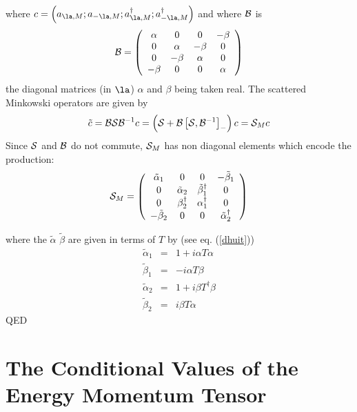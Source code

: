 \documentclass[12pt]{article}
\begin{document}
where $c=  \left( a_{\la,M};a_{- \la,M};a_{\la,M}^\dagger;a_{- \la,M}^\dagger
\right)$
 and where $ {\cal  B}$ is
\begin{equation}
  {\cal  B} =
\left( \begin{array}{cccc}
 \alpha &  0 & 0 & - \beta \\
 0 & \alpha & - \beta  & 0 \\
 0 & - \beta &\alpha & 0 \\
 - \beta  & 0 & 0 & \alpha \\
\end{array} \right)
\label{tthree}
\end{equation}
the diagonal matrices (in $\la$) $\alpha $ and $\beta$ being taken real.
The scattered Minkowski operators are given by
\begin{equation}
\tilde c =  {\cal  B}{ \cal  S}{ \cal  B }^{-1} c = \left(
{ \cal  S} + {\cal  B}\left[ { \cal
S},{ \cal  B }^{-1} \right]_- \right) c = {\cal  S}_M c
\label{tfour}
\end{equation}
Since  ${\cal  S}$ and  ${\cal  B}$ do not commute,  ${\cal  S}_M$ has non
diagonal elements which encode the production: \begin{equation}
  {\cal  S}_M  =
\left( \begin{array}{cccc}
 \tilde \alpha_1 &  0 & 0 & - \tilde \beta _1 \\
 0 & \tilde  \alpha_2 & \tilde  \beta^\dagger _1  & 0 \\
 0 &  \beta^\dagger_2 &\alpha _1^\dagger & 0 \\
 - \tilde  \beta_2  & 0 & 0 &\tilde  \alpha^\dagger_2 \\
\end{array} \right)
\label{tfive}
\end{equation}

where the $\tilde \alpha$ $\tilde \beta$ are given in terms of $T$ by
(see eq. (\ref{dhuit}))
\begin{eqnarray}
 \tilde  \alpha _1 &=&  1+i  \alpha T  \alpha
\nonumber\\
 \tilde
\beta _1  &=& -i  \alpha T \beta
\nonumber\\
\tilde  \alpha _2 &=& 1 +i \beta T^\dagger  \beta
\nonumber\\
\tilde
\beta_2 &=& i  \beta  T  \alpha
\label{tsix}
\end{eqnarray}
QED

\section{The Conditional Values of the Energy Momentum Tensor}
\end{document}
